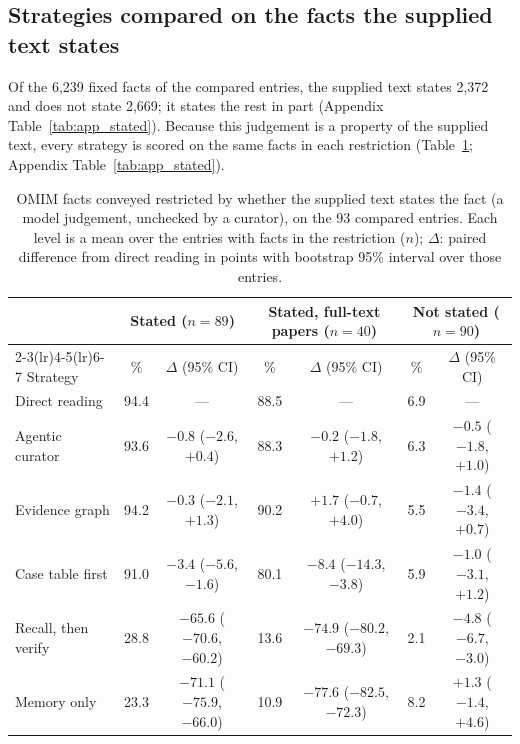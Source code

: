 \documentclass{article} %
\begin{document}
\subsection{Strategies compared on the facts the supplied text states}
\label{sec:stated}
Of the 6,239 fixed facts of the compared entries, the supplied text states 2,372 and does not state 2,669; it states the rest in part (Appendix Table~\ref{tab:app_stated}). Because this judgement is a property of the supplied text, every strategy is scored on the same facts in each restriction (Table~\ref{tab:stated}; Appendix Table~\ref{tab:app_stated}).

\begin{table}[t]
\caption{OMIM facts conveyed restricted by whether the supplied text states the fact (a model judgement, unchecked by a curator), on the 93 compared entries. Each level is a mean over the entries with facts in the restriction ($n$); $\Delta$: paired difference from direct reading in points with bootstrap 95\% interval over those entries.}
\label{tab:stated}
\begin{center}
\footnotesize
\setlength{\tabcolsep}{2.6pt}
\begin{tabular}{lcccccc}
\toprule
 & \multicolumn{2}{c}{Stated ($n=89$)} & \multicolumn{2}{c}{Stated, full-text papers ($n=40$)} & \multicolumn{2}{c}{Not stated ($n=90$)} \\
\cmidrule(lr){2-3}\cmidrule(lr){4-5}\cmidrule(lr){6-7}
Strategy & \% & $\Delta$ (95\% CI) & \% & $\Delta$ (95\% CI) & \% & $\Delta$ (95\% CI) \\
\midrule
Direct reading & 94.4 & --- & 88.5 & --- & 6.9 & --- \\
Agentic curator & 93.6 & $-0.8$ ($-2.6$, $+0.4$) & 88.3 & $-0.2$ ($-1.8$, $+1.2$) & 6.3 & $-0.5$ ($-1.8$, $+1.0$) \\
Evidence graph & 94.2 & $-0.3$ ($-2.1$, $+1.3$) & 90.2 & $+1.7$ ($-0.7$, $+4.0$) & 5.5 & $-1.4$ ($-3.4$, $+0.7$) \\
Case table first & 91.0 & $-3.4$ ($-5.6$, $-1.6$) & 80.1 & $-8.4$ ($-14.3$, $-3.8$) & 5.9 & $-1.0$ ($-3.1$, $+1.2$) \\
Recall, then verify & 28.8 & $-65.6$ ($-70.6$, $-60.2$) & 13.6 & $-74.9$ ($-80.2$, $-69.3$) & 2.1 & $-4.8$ ($-6.7$, $-3.0$) \\
Memory only & 23.3 & $-71.1$ ($-75.9$, $-66.0$) & 10.9 & $-77.6$ ($-82.5$, $-72.3$) & 8.2 & $+1.3$ ($-1.4$, $+4.6$) \\
\bottomrule
\end{tabular}
\end{center}
\end{table}
\end{document}
